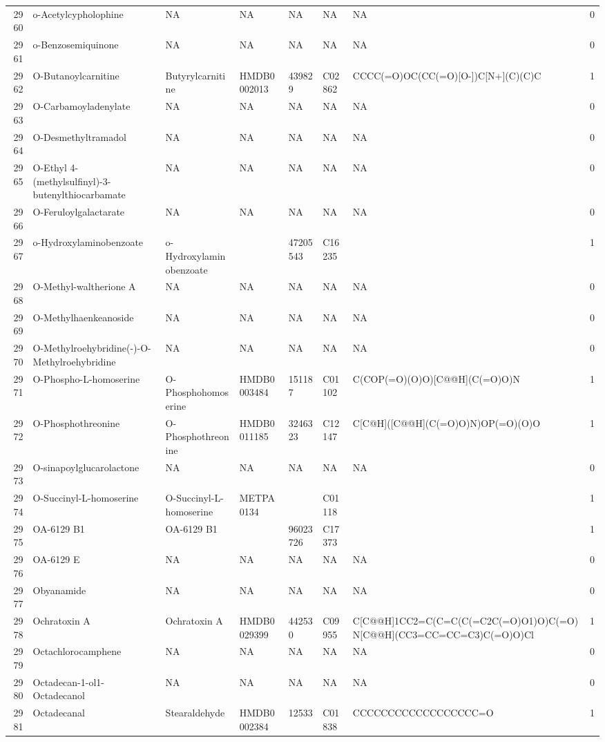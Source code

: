 \documentclass[a4paper]{article}
\begin{document}
\begin{longtable}{rlllllll}
  2960 & o-Acetylcypholophine & NA & NA & NA & NA & NA & 0 \\ 
  2961 & o-Benzosemiquinone & NA & NA & NA & NA & NA & 0 \\ 
  2962 & O-Butanoylcarnitine & Butyrylcarnitine & HMDB0002013 & 439829 & C02862 & CCCC(=O)OC(CC(=O)[O-])C[N+](C)(C)C & 1 \\ 
  2963 & O-Carbamoyladenylate & NA & NA & NA & NA & NA & 0 \\ 
  2964 & O-Desmethyltramadol & NA & NA & NA & NA & NA & 0 \\ 
  2965 & O-Ethyl 4-(methylsulfinyl)-3-butenylthiocarbamate & NA & NA & NA & NA & NA & 0 \\ 
  2966 & O-Feruloylgalactarate & NA & NA & NA & NA & NA & 0 \\ 
  2967 & o-Hydroxylaminobenzoate & o-Hydroxylaminobenzoate &  & 47205543 & C16235 &  & 1 \\ 
  2968 & O-Methyl-waltherione A & NA & NA & NA & NA & NA & 0 \\ 
  2969 & O-Methylhaenkeanoside & NA & NA & NA & NA & NA & 0 \\ 
  2970 & O-Methylroehybridine(-)-O-Methylroehybridine & NA & NA & NA & NA & NA & 0 \\ 
  2971 & O-Phospho-L-homoserine & O-Phosphohomoserine & HMDB0003484 & 151187 & C01102 & C(COP(=O)(O)O)[C@@H](C(=O)O)N & 1 \\ 
  2972 & O-Phosphothreonine & O-Phosphothreonine & HMDB0011185 & 3246323 & C12147 & C[C@H]([C@@H](C(=O)O)N)OP(=O)(O)O & 1 \\ 
  2973 & O-sinapoylglucarolactone & NA & NA & NA & NA & NA & 0 \\ 
  2974 & O-Succinyl-L-homoserine & O-Succinyl-L-homoserine & METPA0134 &  & C01118 &  & 1 \\ 
  2975 & OA-6129 B1 & OA-6129 B1 &  & 96023726 & C17373 &  & 1 \\ 
  2976 & OA-6129 E & NA & NA & NA & NA & NA & 0 \\ 
  2977 & Obyanamide & NA & NA & NA & NA & NA & 0 \\ 
  2978 & Ochratoxin A & Ochratoxin A & HMDB0029399 & 442530 & C09955 & C[C@@H]1CC2=C(C=C(C(=C2C(=O)O1)O)C(=O)N[C@@H](CC3=CC=CC=C3)C(=O)O)Cl & 1 \\ 
  2979 & Octachlorocamphene & NA & NA & NA & NA & NA & 0 \\ 
  2980 & Octadecan-1-ol1-Octadecanol & NA & NA & NA & NA & NA & 0 \\ 
  2981 & Octadecanal & Stearaldehyde & HMDB0002384 & 12533 & C01838 & CCCCCCCCCCCCCCCCCC=O & 1 \\ 

\end{longtable}
\end{document}
